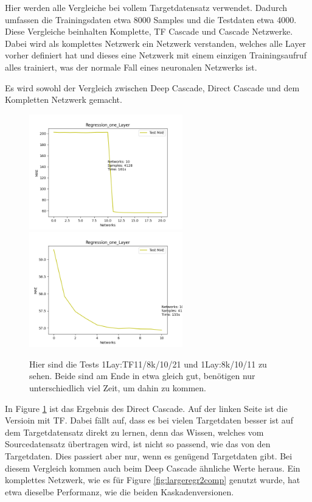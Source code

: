 Hier werden alle Vergleiche bei vollem Targetdatensatz verwendet. 
Dadurch umfassen die Trainingsdaten etwa 8000 Samples und die Testdaten etwa 4000. 
Diese Vergleiche beinhalten Komplette, TF Cascade und Cascade Netzwerke. Dabei wird als komplettes Netzwerk ein Netzwerk verstanden, welches alle 
Layer vorher definiert hat und dieses eine Netzwerk mit einem einzigen Trainingsaufruf alles trainiert, was der normale Fall eines 
neuronalen Netzwerks ist. 

Es wird sowohl der Vergleich zwischen Deep Cascade, Direct Cascade und dem Kompletten Netzwerk gemacht.  

\begin{figure}[htpb]
    \includegraphics[height=5cm]{../../Plots/ba_plots/regression_large/onelayer_ts.png}
    \includegraphics[height=5cm]{../../Plots/ba_plots/regression_large/woonelayer_ts.png}
    \caption{\label{fig:largeregr2} 
    \small{Hier sind die Tests 1Lay:TF11/8k/10/21 und 1Lay:8k/10/11 zu sehen. Beide sind am Ende in etwa gleich gut, benötigen nur unterschiedlich 
    viel Zeit, um dahin zu kommen.}}
\end{figure}

In Figure \ref{fig:largeregr2} ist das Ergebnis des Direct Cascade. Auf der linken Seite ist die Versioin mit TF. Dabei fällt auf, dass es bei vielen 
Targetdaten besser ist auf dem Targetdatensatz direkt zu lernen, denn 
das Wissen, welches vom Sourcedatensatz übertragen wird, ist nicht so passend, wie das von den Targetdaten. Dies passiert aber nur, wenn es 
genügend Targetdaten gibt. Bei diesem Vergleich kommen auch beim Deep Cascade ähnliche Werte heraus. 
Ein komplettes Netzwerk, wie es für Figure \ref{fig:largeregr2comp} genutzt wurde, hat etwa dieselbe Performanz, wie die beiden Kaskadenversionen. 

